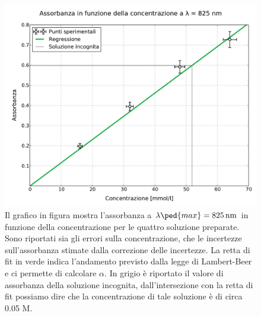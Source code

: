 \begin{figure}
    \includegraphics[scale=0.55]{retta.pdf}
    \caption{Il grafico in figura mostra l'assorbanza a $\lambda\ped{max} = \SI{825}{nm}$ in funzione della concentrazione
        per le quattro soluzione preparate. Sono riportati sia gli errori sulla concentrazione, che le incertezze sull'assorbanza
        stimate dalla correzione delle incertezze. La retta di fit in verde 
        indica l'andamento previsto dalla legge di Lambert-Beer e ci permette di calcolare $\alpha$. In grigio è riportato
        il valore di assorbanza della soluzione incognita, dall'intersezione con la retta di fit possiamo dire che la concentrazione
        di tale soluzione è di circa 0.05 M.}
    \label{fig:a_vs_c}
\end{figure}
